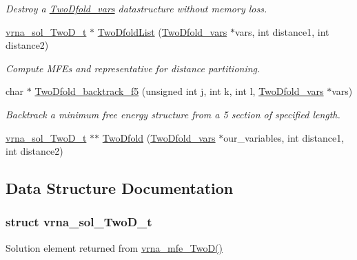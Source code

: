 \begin{DoxyCompactItemize}
\begin{DoxyCompactList}\small\item\em Destroy a \mbox{\hyperlink{group__kl__neighborhood__mfe_structTwoDfold__vars}{Two\+Dfold\+\_\+vars}} datastructure without memory loss. \end{DoxyCompactList}\item 
\mbox{\hyperlink{group__kl__neighborhood__mfe_structvrna__sol__TwoD__t}{vrna\+\_\+sol\+\_\+\+Two\+D\+\_\+t}} $\ast$ \mbox{\hyperlink{group__kl__neighborhood__mfe_ga7fc5e3e92fe97914ca4eccd33c01c2a7}{Two\+Dfold\+List}} (\mbox{\hyperlink{group__kl__neighborhood__mfe_structTwoDfold__vars}{Two\+Dfold\+\_\+vars}} $\ast$vars, int distance1, int distance2)
\begin{DoxyCompactList}\small\item\em Compute M\+FE\textquotesingle{}s and representative for distance partitioning. \end{DoxyCompactList}\item 
char $\ast$ \mbox{\hyperlink{group__kl__neighborhood__mfe_gaf4dc05bf8fc1ea53acd7aeb798ba80c2}{Two\+Dfold\+\_\+backtrack\+\_\+f5}} (unsigned int j, int k, int l, \mbox{\hyperlink{group__kl__neighborhood__mfe_structTwoDfold__vars}{Two\+Dfold\+\_\+vars}} $\ast$vars)
\begin{DoxyCompactList}\small\item\em Backtrack a minimum free energy structure from a 5\textquotesingle{} section of specified length. \end{DoxyCompactList}\item 
\mbox{\hyperlink{group__kl__neighborhood__mfe_structvrna__sol__TwoD__t}{vrna\+\_\+sol\+\_\+\+Two\+D\+\_\+t}} $\ast$$\ast$ \mbox{\hyperlink{group__kl__neighborhood__mfe_ga9827e1deba983a95d0509d36b61fb0e2}{Two\+Dfold}} (\mbox{\hyperlink{group__kl__neighborhood__mfe_structTwoDfold__vars}{Two\+Dfold\+\_\+vars}} $\ast$our\+\_\+variables, int distance1, int distance2)
\end{DoxyCompactItemize}


\subsection{Data Structure Documentation}
\label{structvrna__sol__TwoD__t}
\subsubsection{struct vrna\+\_\+sol\+\_\+\+Two\+D\+\_\+t}
Solution element returned from \mbox{\hyperlink{group__kl__neighborhood__mfe_ga243c288b463147352829df04de6a2f77}{vrna\+\_\+mfe\+\_\+\+Two\+D()}} 

